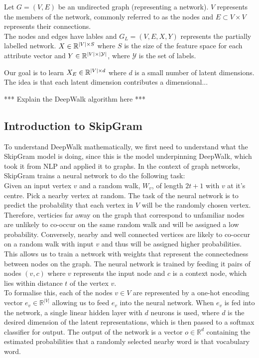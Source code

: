 \documentclass[a4paper]{article}
\begin{document}
\begin{definition}
  Let $G = (V, E)$ be an undirected graph (representing a network). $V$ represents the
  members of the network, commonly referred to as the nodes and $E \subset V
  \times V$ represents their connections.\\

  The nodes and edges have lables and $G_L = (V, E, X, Y)$ represents the
  partially labelled network. $X \in \R^{|V| \times S}$ where $S$ is the size of
  the feature space for each attribute vector and $Y \in \R^{|V| \times
    |\mathcal{Y}|}$, where $\mathcal{Y}$ is the set of labels.
\end{definition}

Our goal is to learn $X_E \in \R^{|V| \times d}$ where $d$ is a small number
of latent dimensions. The idea is that each latent dimension contributes a 
dimensional...

*** Explain the DeepWalk algorithm here ***

\subsection{Introduction to SkipGram}
To understand DeepWalk mathematically, we first need to understand what the SkipGram
model is doing, since this is the model underpinning DeepWalk, which took it
from NLP and applied it to graphs. In the context of graph networks, SkipGram trains a neural network to do the
following task:\\
Given an input vertex $v$ and a random walk, $W_{v}$, of length $2t+1$ with $v$
at it's centre. Pick a nearby vertex at random. The task of the neural network is to
predict the probability that each vertex in $V$ will be the randomly chosen
vertex. Therefore, verticies far away on the graph that correspond to unfamiliar
nodes are unlikely to co-occur on the same random walk and will be assigned a
low probability. Conversely, nearby and well connected vertices are likely to
co-occur on a random walk with input $v$ and thus will be assigned higher
probabilities. This allows us to train a network with weights that represent the
connectedness between nodes on the graph. The neural network is trained by
feeding it pairs of nodes $(v, c)$ where $v$ represents the input node and $c$ is a context node, which lies within distance
$t$ of the vertex $v$.\\ 

To formalise this, each of the nodes $v \in V$ are represented by a one-hot
encoding vector $e_v \in \mathbb{R}^{|V|}$ allowing us to feed $e_v$ into the
neural network. When $e_v$ is fed into the network, a single linear hidden layer with
$d$ neurons is used, where $d$ is the desired dimension of the latent
representations, which is then passed to a softmax classifier for output. The
output of the network is a vector $o \in \mathbb{R}^d$ containing the estimated
probabilities that a randomly selected nearby word is that vocabulary word.
\end{document}
